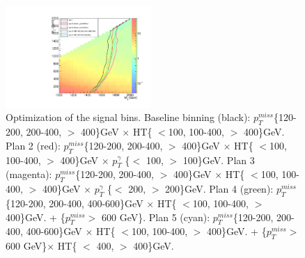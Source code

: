 \documentclass[thesis.tex]{subfiles}
\renewcommand\_{\textunderscore\allowbreak}
\begin{document}
\begin{figure}
  \centering
    \includegraphics[width=0.49\textwidth]{Figures/binningOpt.pdf}
		\caption{Optimization of the signal bins. Baseline binning (black): $p_T^{miss}$\{120-200, 200-400, $ >$ 400\}GeV $\times$ HT\{ $<$100, 100-400, $ >$ 400\}GeV. Plan 2 (red): $p_T^{miss}$\{120-200, 200-400, $ >$ 400\}GeV $\times$ HT\{ $<$100, 100-400, $ >$ 400\}GeV $\times$ $p_T^\gamma$ \{$<$ 100, $>$ 100\}GeV. Plan 3 (magenta): $p_T^{miss}$\{120-200, 200-400, $ >$ 400\}GeV $\times$ HT\{ $<$100, 100-400, $ >$ 400\}GeV $\times$ $p_T^\gamma$ \{$<$ 200, $>$ 200\}GeV. Plan 4 (green): $p_T^{miss}$\{120-200, 200-400, 400-600\}GeV $\times$ HT\{ $<$100, 100-400, $ >$ 400\}GeV. + \{$p_T^{miss} > $ 600 GeV\}. Plan 5 (cyan): $p_T^{miss}$\{120-200, 200-400, 400-600\}GeV $\times$ HT\{ $<$100, 100-400, $ >$ 400\}GeV. + \{$p_T^{miss} > $ 600 GeV\}$\times$ HT\{ $<$ 400, $ >$ 400\}GeV. }
    \label{fig:optbin}
\end{figure}
\end{document}
